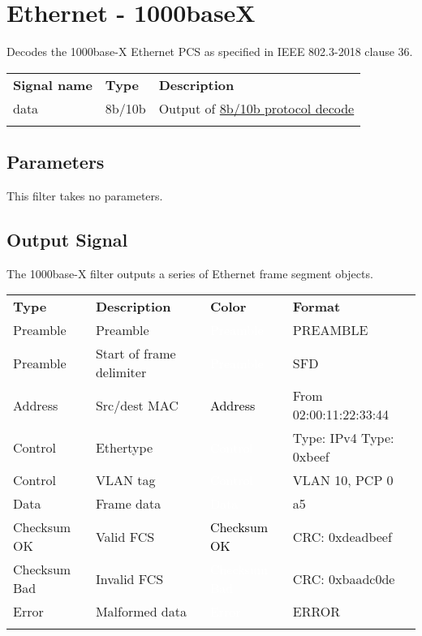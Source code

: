 \section{Ethernet - 1000baseX}
\label{filter:1000basex}

Decodes the 1000base-X Ethernet PCS as specified in IEEE 802.3-2018 clause 36.

\begin{tabularx}{16cm}{llX}
\thickhline
\textbf{Signal name} & \textbf{Type} & \textbf{Description} \\
\thickhline
data & 8b/10b & Output of \hyperref[proto:8b10b]{8b/10b protocol decode}\\
\thickhline
\end{tabularx}

\subsection{Parameters}

This filter takes no parameters.

\subsection{Output Signal}

The 1000base-X filter outputs a series of Ethernet frame segment objects.

\begin{tabularx}{16cm}{lllX}
\thickhline
\textbf{Type} & \textbf{Description} & \textbf{Color} & \textbf{Format} \\
\thickhline
Preamble & Preamble & \cellcolor{preamble}\textcolor{white}{Preamble} & PREAMBLE \\
\thinhline
Preamble & Start of frame delimiter & \cellcolor{preamble}\textcolor{white}{Preamble} & SFD \\
\thinhline
Address & Src/dest MAC & \cellcolor{address}\textcolor{black}{Address} & From 02:00:11:22:33:44 \\
\thinhline
Control & Ethertype & \cellcolor{control}\textcolor{white}{Control} & Type: IPv4 \newline Type: 0xbeef \\
\thinhline
Control & VLAN tag & \cellcolor{control}\textcolor{white}{Control} & VLAN 10, PCP 0 \\
\thinhline
Data & Frame data & \cellcolor{data}\textcolor{white}{Data} & a5 \\
\thinhline
Checksum OK & Valid FCS & \cellcolor{checksumok}\textcolor{black}{Checksum OK} & CRC: 0xdeadbeef \\
\thinhline
Checksum Bad & Invalid FCS & \cellcolor{checksumbad}\textcolor{white}{Checksum Bad} & CRC: 0xbaadc0de \\
\thinhline
Error & Malformed data & \cellcolor{error}\textcolor{white}{Error} & ERROR \\
\thickhline
\end{tabularx}

